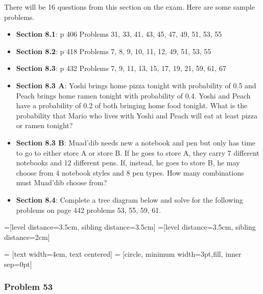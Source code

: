 \documentclass[12pt]{article}
\begin{document}
There will be 16 questions from this section on the exam. Here are some sample problems.
\begin{itemize}
\item \textbf{Section 8.1}: p 406 Problems 31, 33, 41, 43, 45, 47, 49, 51, 53, 55
\item \textbf{Section 8.2}: p 418 Problems 7, 8, 9, 10, 11, 12, 49, 51, 53, 55
\item  \textbf{Section 8.3}: p 432 Problems 7, 9, 11, 13, 15, 17, 19, 21, 59, 61, 67
\item \textbf{Section 8.3 A}: Yoshi brings home pizza tonight with probability of 0.5 and Peach brings home ramen tonight with probability of 0.4. Yoshi and Peach have a probability of 0.2 of both bringing home food tonight. What is the probability that Mario who lives with Yoshi and Peach will eat at least pizza or ramen tonight?
\item \textbf{Section 8.3 B}: Muad'dib needs new a notebook and pen but only has time to go to either store A or store B. If he goes to store A, they carry 7 different notebooks and 12 different pens. If, instead, he goes to store B, he may choose from 4 notebook styles and 8 pen types. How many combinations must Muad'dib choose from?
\item  \textbf{Section 8.4}: Complete a tree diagram below and solve for the following problems on page 442 problems 53, 55, 59, 61.



\end{itemize}

=[level distance=3.5cm, sibling distance=3.5cm]
=[level distance=3.5cm, sibling distance=2cm]

 = [text width=4em, text centered]
 = [circle, minimum width=3pt,fill, inner sep=0pt]

\subsubsection*{Problem 53}
\end{document}
